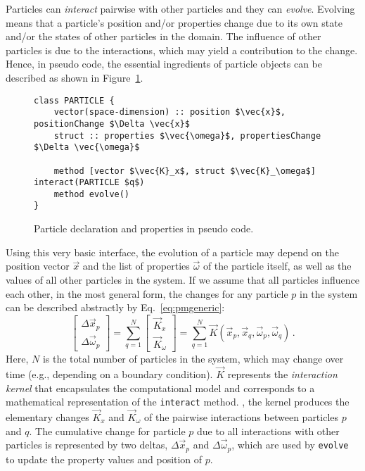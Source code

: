 Particles can \emph{interact} pairwise with other particles and they can \emph{evolve}. Evolving means
that a particle's position and/or properties change due to its own state and/or the states of other particles in the domain.
The influence of other particles is due to the interactions, which may yield a contribution to the change.
Hence, in pseudo code, the essential ingredients of particle objects can be described as shown in 
Figure~\ref{list:particles_structure}.%
{\addtolength{\abovecaptionskip}{-4mm}%
\begin{figure}[th]%
\begin{lstlisting}[basicstyle=\footnotesize\ttfamily,numbers=none,
keywords={class,method,struct,vector},belowskip=0pt,aboveskip=0pt,
framesep=0pt,rulesep=0pt,frame=none,mathescape=true]
class PARTICLE {
    vector(space-dimension) :: position $\vec{x}$, positionChange $\Delta \vec{x}$
    struct :: properties $\vec{\omega}$, propertiesChange $\Delta \vec{\omega}$
    
    method [vector $\vec{K}_x$, struct $\vec{K}_\omega$]  interact(PARTICLE $q$)
    method evolve()
}
\end{lstlisting}%
\caption{Particle declaration and properties in pseudo code.}%
\label{list:particles_structure}%
\end{figure}%
}
Using this very basic interface, the evolution of a particle may depend on the position vector $\vec{x}$
and the list of properties  $\vec{\omega}$ of the particle itself, as well as the values of all other particles
in the system. If we assume that all particles influence each other, in the most general form, the 
 changes for any particle $p$ in the system can be described abstractly by Eq.~\ref{eq:pmgeneric}:
%
\begin{equation}
\begin{bmatrix} \Delta \vec{x}_p \\ \Delta \vec{\omega}_p \end{bmatrix} = \sum_{q=1}^{N} \begin{bmatrix} \vec{K}_x \\ \vec{K}_\omega \end{bmatrix} = \sum_{q=1}^{N} \vec{K}(\vec{x}_p, \vec{x}_q, \vec{\omega}_p, \vec{\omega}_q)\, .  \label{eq:pmgeneric}
\end{equation}
%
Here, $N$ is the total number of particles in the system, which may change over time (e.g., depending on a
boundary condition). $\vec{K}$ represents the \emph{interaction kernel} that encapsulates the 
computational model and corresponds to a mathematical representation of the \texttt{interact} method. 
, the kernel produces the elementary changes $\vec{K}_x$ and $\vec{K}_\omega$ of the pairwise interactions 
between particles $p$ and $q$. The cumulative change for particle $p$ due to all interactions with other
particles is represented by two deltas, $\Delta \vec{x}_p$ and $\Delta \vec{\omega}_p $, which are used
by \texttt{evolve} to update the property values and position of $p$. 

